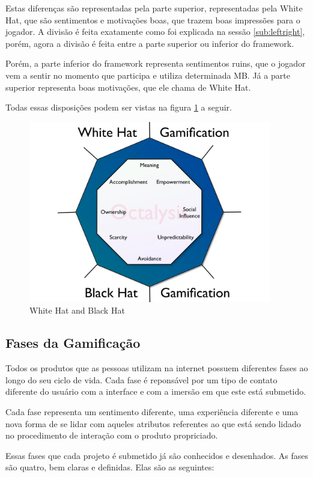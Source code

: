 Estas diferenças são representadas pela parte superior, representadas
pela White Hat, que são sentimentos e motivações boas, que trazem
boas impressões para o jogador. A divisão é feita exatamente como
foi explicada na sessão \ref{sub:leftright}, porém, agora a
divisão é feita entre a parte superior ou inferior do framework.

Porém, a parte inferior do framework representa sentimentos ruins, que o jogador
vem a sentir no momento que participa e utiliza determinada MB. Já a
parte superior representa boas motivações, que ele chama de White Hat.

Todas essas disposições podem ser vistas na figura
\ref{fig:octalysiswhiteblack} a seguir.

\begin{figure}[h]
    \centering
    \includegraphics[width=400px, scale=1]{figuras/octalysiswhiteblack}
    \caption{White Hat and Black Hat}
    \label{fig:octalysiswhiteblack}
\end{figure}

\subsection{Fases da Gamificação}
\label{sub:fasesgamification}
Todos os produtos que as pessoas utilizam na internet possuem diferentes
fases ao longo do seu ciclo de vida. Cada fase é reponsável por um tipo de contato diferente
do usuário com a interface e com a imersão em que este está submetido.

Cada fase representa um sentimento diferente, uma experiência diferente
e uma nova forma de se lidar com aqueles atributos referentes ao que está
sendo lidado no procedimento de interação com o produto propriciado.

Essas fases que cada projeto é submetido já são conhecidos e desenhados. As fases
são quatro, bem claras e definidas. Elas são as seguintes:

